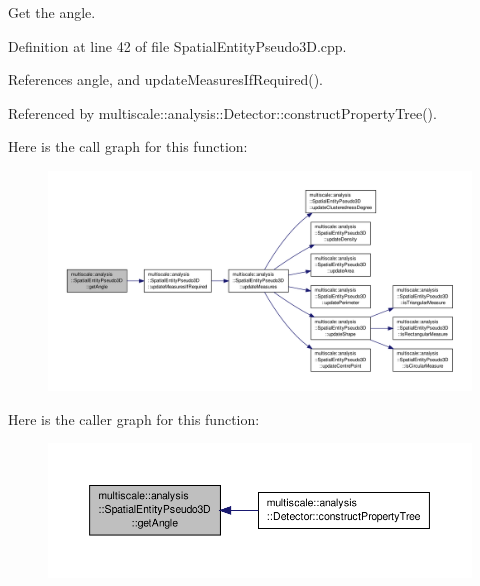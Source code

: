 Get the angle. 



Definition at line 42 of file Spatial\-Entity\-Pseudo3\-D.\-cpp.



References angle, and update\-Measures\-If\-Required().



Referenced by multiscale\-::analysis\-::\-Detector\-::construct\-Property\-Tree().



Here is the call graph for this function\-:
\nopagebreak
\begin{figure}[H]
\begin{center}
\leavevmode
\includegraphics[width=350pt]{classmultiscale_1_1analysis_1_1SpatialEntityPseudo3D_a9f3394cfe46d66ae9c13d805ad460cb5_cgraph}
\end{center}
\end{figure}




Here is the caller graph for this function\-:
\nopagebreak
\begin{figure}[H]
\begin{center}
\leavevmode
\includegraphics[width=350pt]{classmultiscale_1_1analysis_1_1SpatialEntityPseudo3D_a9f3394cfe46d66ae9c13d805ad460cb5_icgraph}
\end{center}
\end{figure}


